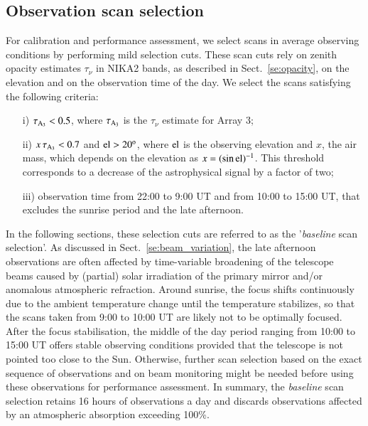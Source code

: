 \documentclass[traditionalabstract]{aa}
\newcommand{\elev}{\rm{el}}
\newcommand{\taunu}{\tau_{\nu}}
\newcommand{\airmass}{air mass}
\newcommand{\lp}[1]{#1}
\begin{document}
\subsection{Observation scan selection}
\label{se:data_selection}

For calibration and performance assessment, we select scans in average
observing conditions by performing mild selection cuts. These scan
cuts rely on zenith opacity estimates $\taunu$ in NIKA2 bands, as
described in Sect.~\ref{se:opacity}, on the elevation and on the
observation time of the day. We select the scans satisfying the
following criteria:
%
\begin{itemize}
\item[i)] $\tau_{\rm{A_3}} < 0.5$, where $\tau_{\rm{A_3}}$ is the $\taunu$ estimate for
  Array 3; 
\item[ii)] $x\, \tau_{\rm{A_3}} < 0.7$ and $\elev > 20^{o}$, where
$\elev$ is the observing elevation and $x$, the
  \airmass, which depends on the elevation as $x=(\sin{\elev})^{-1}$. This
  threshold corresponds to a decrease of the astrophysical signal by a
  factor of two;
\item[iii)] observation time from 22:00 to 9:00 UT and from 10:00 to
  15:00 UT, that excludes the sunrise period and the late afternoon.
\end{itemize}
%
{\lp In the following sections, these selection cuts are referred to as the 
'\emph{baseline} scan selection'.}  
As discussed in Sect.~\ref{se:beam_variation}, the late afternoon
observations are often affected by time-variable broadening of the
telescope beams caused by (partial) solar irradiation of the primary
mirror and/or anomalous atmospheric refraction.
Around sunrise, the focus shifts continuously due to the ambient temperature
change until the temperature stabilizes, so that the scans taken from
9:00 to 10:00 UT are likely not to be optimally focused.
After the focus stabilisation, the middle of the day period ranging
from 10:00 to 15:00 UT offers stable observing conditions
provided that the telescope is not pointed too
close to the Sun.
Otherwise, further scan selection based on
the exact sequence of observations and on beam monitoring might be
needed before using these observations for performance assessment.
{\lp In summary, the \emph{baseline} scan selection retains 16 hours of
observations a day and discards observations affected by an
atmospheric absorption exceeding 100\%.}  


\end{document}
